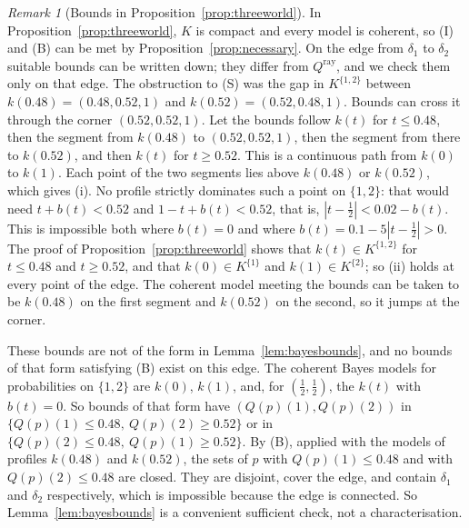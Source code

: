 \documentclass[11pt]{article}
\theoremstyle{definition}
\theoremstyle{remark}
\newtheorem{remark}[theorem]{Remark}
\begin{document}
\begin{remark}[Bounds in Proposition~\ref{prop:threeworld}]\label{rem:threeworld-bounds}
In Proposition~\ref{prop:threeworld}, $K$ is compact and every model is coherent, so (I) and (B) can be met by Proposition~\ref{prop:necessary}. On the edge from $\delta_1$ to $\delta_2$ suitable bounds can be written down; they differ from $Q^{\mathrm{ray}}$, and we check them only on that edge. The obstruction to (S) was the gap in $K^{\{1,2\}}$ between $k(0.48)=(0.48,0.52,1)$ and $k(0.52)=(0.52,0.48,1)$. Bounds can cross it through the corner $(0.52,0.52,1)$. Let the bounds follow $k(t)$ for $t\le0.48$, then the segment from $k(0.48)$ to $(0.52,0.52,1)$, then the segment from there to $k(0.52)$, and then $k(t)$ for $t\ge0.52$. This is a continuous path from $k(0)$ to $k(1)$. Each point of the two segments lies above $k(0.48)$ or $k(0.52)$, which gives (i). No profile strictly dominates such a point on $\{1,2\}$: that would need $t+b(t)<0.52$ and $1-t+b(t)<0.52$, that is, $|t-\tfrac12|<0.02-b(t)$. This is impossible both where $b(t)=0$ and where $b(t)=0.1-5|t-\tfrac12|>0$. The proof of Proposition~\ref{prop:threeworld} shows that $k(t)\in K^{\{1,2\}}$ for $t\le0.48$ and $t\ge0.52$, and that $k(0)\in K^{\{1\}}$ and $k(1)\in K^{\{2\}}$; so (ii) holds at every point of the edge. The coherent model meeting the bounds can be taken to be $k(0.48)$ on the first segment and $k(0.52)$ on the second, so it jumps at the corner.

These bounds are not of the form in Lemma~\ref{lem:bayesbounds}, and no bounds of that form satisfying (B) exist on this edge. The coherent Bayes models for probabilities on $\{1,2\}$ are $k(0)$, $k(1)$, and, for $(\tfrac12,\tfrac12)$, the $k(t)$ with $b(t)=0$. So bounds of that form have $(Q(p)(1),Q(p)(2))$ in $\{Q(p)(1)\le0.48,\ Q(p)(2)\ge0.52\}$ or in $\{Q(p)(2)\le0.48,\ Q(p)(1)\ge0.52\}$. By (B), applied with the models of profiles $k(0.48)$ and $k(0.52)$, the sets of $p$ with $Q(p)(1)\le0.48$ and with $Q(p)(2)\le0.48$ are closed. They are disjoint, cover the edge, and contain $\delta_1$ and $\delta_2$ respectively, which is impossible because the edge is connected. So Lemma~\ref{lem:bayesbounds} is a convenient sufficient check, not a characterisation.
\end{remark}
\end{document}
